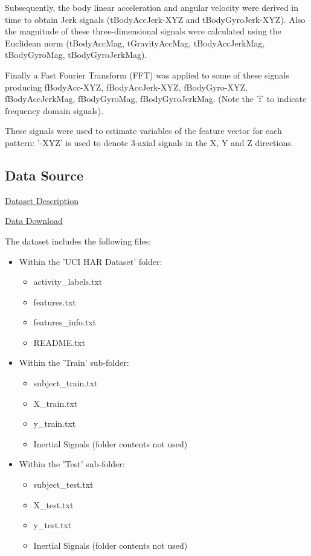 \documentclass{article}
\begin{document}
Subsequently, the body linear acceleration and angular velocity were derived in time to obtain Jerk signals (tBodyAccJerk-XYZ and tBodyGyroJerk-XYZ). Also the magnitude of these three-dimensional signals were calculated using the Euclidean norm (tBodyAccMag, tGravityAccMag, tBodyAccJerkMag, tBodyGyroMag, tBodyGyroJerkMag). \par

Finally a Fast Fourier Transform (FFT) was applied to some of these signals producing fBodyAcc-XYZ, fBodyAccJerk-XYZ, fBodyGyro-XYZ, fBodyAccJerkMag, fBodyGyroMag, fBodyGyroJerkMag. (Note the 'f' to indicate frequency domain signals). \par

These signals were used to estimate variables of the feature vector for each pattern: '-XYZ' is used to denote 3-axial signals in the X, Y and Z directions.

\subsection{Data Source}

\href{http://archive.ics.uci.edu/ml/datasets/Human+Activity+Recognition+Using+Smartphones}{Dataset Description} \par

\href{https://d396qusza40orc.cloudfront.net/getdata%2Fprojectfiles%2FUCI%20HAR%20Dataset.zip}{Data Download} \par

The dataset includes the following files:
\begin{itemize}
	\item Within the 'UCI HAR Dataset' folder:
	\begin {itemize}
		\item activity\_labels.txt
		\item features.txt
		\item features\_info.txt
		\item README.txt		
	\end{itemize}
	\item Within the 'Train' sub-folder:
	\begin{itemize}
		\item subject\_train.txt
		\item X\_train.txt
		\item y\_train.txt
		\item Inertial Signals (folder contents not used)
	\end{itemize}
	\item Within the 'Test' sub-folder:
	\begin{itemize}
		\item subject\_test.txt
		\item X\_test.txt
		\item y\_test.txt
		\item Inertial Signals (folder contents not used)
	\end{itemize}
\end{itemize}
\end{document}
